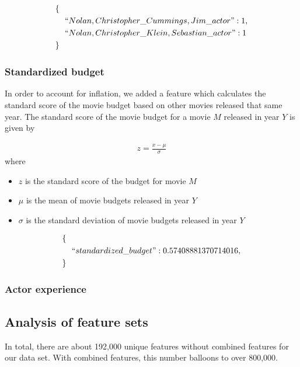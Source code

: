 \documentclass[journal]{IEEEtran}
\begin{document}
\begin{align*}
        \{\ \ &\\
        &``Nolan,Christopher\_Cummings,Jim\_actor": 1,\\
        &``Nolan,Christopher\_Klein,Sebastian\_actor": 1\\
        \}\ \ &
\end{align*}

\subsubsection{Standardized budget}
In order to account for inflation, we added a feature which calculates the
standard score of the movie budget based on other movies released that same
year.  The standard score of the movie budget for a movie $M$ released in year
$Y$ is given by

\begin{eqnarray*}
    z = \frac{x - \mu}{\sigma}
\end{eqnarray*}
where
\begin{itemize}
    \item $z$ is the standard score of the budget for movie $M$
    \item $\mu$ is the mean of movie budgets released in year $Y$
    \item $\sigma$ is the standard deviation of movie budgets released in year $Y$
\end{itemize}
\begin{align*}
        \{\ \ &\\
        &``standardized\_budget": 0.57408881370714016,\\
        \}\ \ &
\end{align*}

\subsubsection{Actor experience}

\subsection{Analysis of feature sets}
In total, there are about 192,000 unique features without combined features for
our data set.  With combined features, this number balloons to over 800,000.
\end{document}

